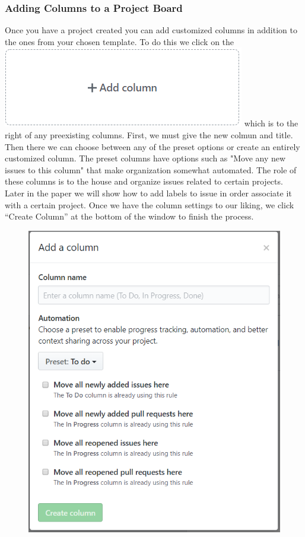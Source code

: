 \documentclass[11pt]{article}
\begin{document}
\subsubsection{Adding Columns to a Project Board}
Once you have a project created you can add customized columns in addition to the ones from your chosen template. To do this we click on the \includegraphics[scale=.2]{AddColumn.png} which is to the right of any preexisting columns. First, we must give the new colmun and title. Then there we can choose between any of the preset options or create an entirely customized column. The preset columns have options such as "Move any new issues to this column" that make organization somewhat automated. The role of these columns is to the house and organize issues related to certain projects. Later in the paper we will show how to add labels to issue in order associate it with a certain project. Once we have the column settings to our liking, we click ``Create Column'' at the bottom of the window to finish the process. 
\begin{figure}[h!]
\begin{center}
\includegraphics[scale=.8]{CreateColumn.png}
\end{center}
\end{figure}
\end{document}

